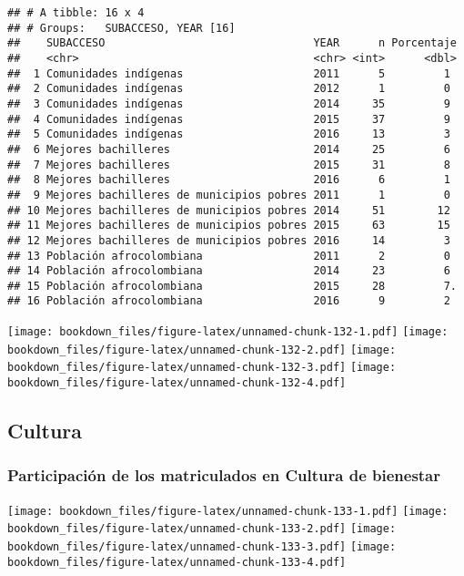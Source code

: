 \documentclass[]{article}
\theoremstyle{definition}
\theoremstyle{definition}
\theoremstyle{definition}
\theoremstyle{remark}
\begin{document}
\begin{verbatim}
## # A tibble: 16 x 4
## # Groups:   SUBACCESO, YEAR [16]
##    SUBACCESO                                YEAR      n Porcentaje
##    <chr>                                    <chr> <int>      <dbl>
##  1 Comunidades indígenas                    2011      5         1 
##  2 Comunidades indígenas                    2012      1         0 
##  3 Comunidades indígenas                    2014     35         9 
##  4 Comunidades indígenas                    2015     37         9 
##  5 Comunidades indígenas                    2016     13         3 
##  6 Mejores bachilleres                      2014     25         6 
##  7 Mejores bachilleres                      2015     31         8 
##  8 Mejores bachilleres                      2016      6         1 
##  9 Mejores bachilleres de municipios pobres 2011      1         0 
## 10 Mejores bachilleres de municipios pobres 2014     51        12 
## 11 Mejores bachilleres de municipios pobres 2015     63        15 
## 12 Mejores bachilleres de municipios pobres 2016     14         3 
## 13 Población afrocolombiana                 2011      2         0 
## 14 Población afrocolombiana                 2014     23         6 
## 15 Población afrocolombiana                 2015     28         7.
## 16 Población afrocolombiana                 2016      9         2
\end{verbatim}

\texttt{[image: bookdown\_files/figure-latex/unnamed-chunk-132-1.pdf]}
\texttt{[image: bookdown\_files/figure-latex/unnamed-chunk-132-2.pdf]}
\texttt{[image: bookdown\_files/figure-latex/unnamed-chunk-132-3.pdf]}
\texttt{[image: bookdown\_files/figure-latex/unnamed-chunk-132-4.pdf]}

\subsection{Cultura}\label{cultura}

\subsubsection{Participación de los matriculados en Cultura de
bienestar}\label{participacion-de-los-matriculados-en-cultura-de-bienestar}

\texttt{[image: bookdown\_files/figure-latex/unnamed-chunk-133-1.pdf]}
\texttt{[image: bookdown\_files/figure-latex/unnamed-chunk-133-2.pdf]}
\texttt{[image: bookdown\_files/figure-latex/unnamed-chunk-133-3.pdf]}
\texttt{[image: bookdown\_files/figure-latex/unnamed-chunk-133-4.pdf]}
\end{document}
